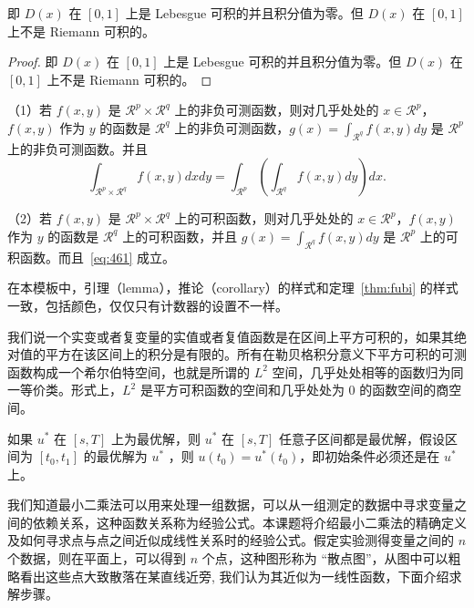 \documentclass[color=blue,lang=cn,newtx,10pt,scheme=chinese]{elegantbook}
\begin{document}
\begin{solution}
即 $D(x)$ 在 $[0,1]$ 上是 Lebesgue 可积的并且积分值为零。但 $D(x)$ 在 $[0,1]$ 上不是 Riemann 可积的。
\end{solution}

\begin{proof}
即 $D(x)$ 在 $[0,1]$ 上是 Lebesgue 可积的并且积分值为零。但 $D(x)$ 在 $[0,1]$ 上不是 Riemann 可积的。
\end{proof}

\begin{theorem}[Fubini 定理] \label{thm:fubi} 
（1）若 $f(x,y)$ 是 $\mathcal{R}^p\times\mathcal{R}^q$ 上的非负可测函数，则对几乎处处的 $x\in \mathcal{R}^p$，$f(x,y)$ 作为 $y$ 的函数是 $\mathcal{R}^q$ 上的非负可测函数，$g(x)=\int_{\mathcal{R}^q}f(x,y) dy$ 是 $\mathcal{R}^p$ 上的非负可测函数。并且
\begin{equation}
   \label{eq:461}
   \int_{\mathcal{R}^p\times\mathcal{R}^q} f(x,y) dxdy=\int_{\mathcal{R}^p}\left(\int_{\mathcal{R}^q}f(x,y)dy\right)dx.
\end{equation}

（2）若 $f(x,y)$ 是 $\mathcal{R}^p\times\mathcal{R}^q$ 上的可积函数，则对几乎处处的 $x\in\mathcal{R}^p$，$f(x,y)$ 作为 $y$ 的函数是 $\mathcal{R}^q$ 上的可积函数，并且 $g(x)=\int_{\mathcal{R}^q}f(x,y) dy$ 是 $\mathcal{R}^p$ 上的可积函数。而且~\eqref{eq:461} 成立。
\end{theorem}

\begin{note}
在本模板中，引理（lemma），推论（corollary）的样式和定理~\ref{thm:fubi} 的样式一致，包括颜色，仅仅只有计数器的设置不一样。
\end{note}

我们说一个实变或者复变量的实值或者复值函数是在区间上平方可积的，如果其绝对值的平方在该区间上的积分是有限的。所有在勒贝格积分意义下平方可积的可测函数构成一个希尔伯特空间，也就是所谓的 $L^2$ 空间，几乎处处相等的函数归为同一等价类。形式上，$L^2$ 是平方可积函数的空间和几乎处处为 0 的函数空间的商空间。

\begin{proposition}[最优性原理] \label{pro:max}
如果 $u^*$ 在 $[s,T]$ 上为最优解，则 $u^*$ 在 $[s, T]$ 任意子区间都是最优解，假设区间为 $[t_0, t_1]$ 的最优解为 $u^*$ ，则 $u(t_0)=u^{*}(t_0)$，即初始条件必须还是在 $u^*$ 上。
\end{proposition}

我们知道最小二乘法可以用来处理一组数据，可以从一组测定的数据中寻求变量之间的依赖关系，这种函数关系称为经验公式。本课题将介绍最小二乘法的精确定义及如何寻求点与点之间近似成线性关系时的经验公式。假定实验测得变量之间的 $n$ 个数据，则在平面上，可以得到 $n$ 个点，这种图形称为 “散点图”，从图中可以粗略看出这些点大致散落在某直线近旁, 我们认为其近似为一线性函数，下面介绍求解步骤。
\end{document}
